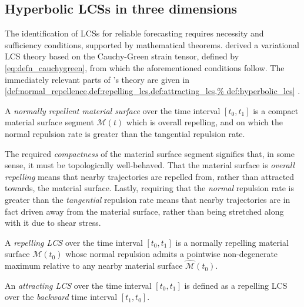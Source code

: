 \subsection{Hyperbolic LCSs in three dimensions}
\label{sub:hyperbolic_lcss_in_three_dimensions}

The identification of LCSs for reliable forecasting requires necessity and
sufficiency conditions, supported by mathematical theorems.
\textcite{haller2011variational} derived a variational LCS theory based on
the Cauchy-Green strain tensor, defined by \cref{eq:defn_cauchygreen}, from
which the aforementioned conditions follow. The immediately relevant parts
of \citeauthor{haller2011variational}'s theory are given in
\cref{def:normal_repellence,def:repelling_lcs,def:attracting_lcs,%
def:hyperbolic_lcs} \parencite{haller2011variational}.

\begin{defn}
    \label{def:normal_repellence}
    A \emph{normally repellent material surface} over the time interval
    $[t_{0},t_{1}]$ is a compact material surface segment $\mathcal{M}(t)$
    which is overall repelling, and on which the normal repulsion rate is
    greater than the tangential repulsion rate.
\end{defn}

The required \emph{compactness} of the material surface segment signifies that,
in some sense, it must be topologically well-behaved. That the material surface
is \emph{overall repelling} means that nearby trajectories are repelled from,
rather than attracted towards, the material surface. Lastly, requiring that the
\emph{normal} repulsion rate is greater than the \emph{tangential} repulsion
rate means that nearby trajectories are in fact driven away from the material
surface, rather than being stretched along with it due to shear stress.

\begin{defn}
    \label{def:repelling_lcs}
    A \emph{repelling LCS} over the time interval $[t_{0},t_{1}]$ is a
    normally repelling material surface $\mathcal{M}(t_{0})$ whose normal
    repulsion admits a pointwise non-degenerate maximum relative to any nearby
    material surface $\widehat{\mathcal{M}}(t_{0})$.
\end{defn}

\begin{defn}
    \label{def:attracting_lcs}
    An \emph{attracting LCS} over the time interval $[t_{0},t_{1}]$ is defined
    as a repelling LCS over the \emph{backward} time interval $[t_{1},t_{0}]$.
\end{defn}

